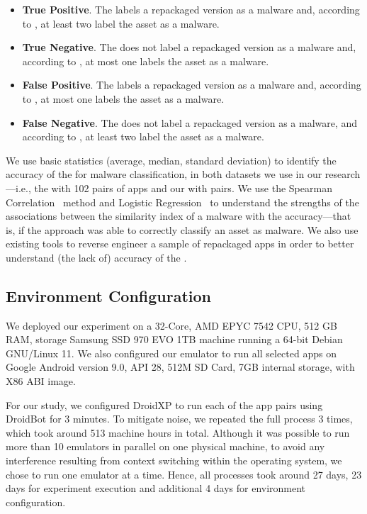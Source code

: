 \begin{itemize}
\item {\bf True Positive}. The \mas labels a repackaged version as a malware and, according to
  \vt, at least two \ses label the asset as a malware.
  
\item {\bf True Negative}. The \mas does not label a repackaged version as a malware and,
  according to \vt, at most one \se labels the asset as a malware. 

\item {\bf False Positive}. The \mas labels a repackaged version as a malware and, according to
  \vt, at most one \se labels the asset as a malware.

\item {\bf False Negative}. The \mas does not label a repackaged version as a malware, and
  according to \vt, at least two \ses label the asset as a malware.
\end{itemize}

We use basic statistics (average, median, standard deviation) to identify the
accuracy of the \mas for malware classification, in both
datasets we use in our research---i.e., the \sds
with 102 pairs of apps and our \cds with
\apps pairs. We use the Spearman Correlation~\cite{spearman-correlation} method and
Logistic Regression~\cite{statistical-learning} to understand the strengths of
the associations between the similarity index of a
malware with the \mas accuracy---that is,
if the approach was able to correctly classify an asset as malware. We also use existing tools to reverse engineer a sample of repackaged
apps in order to better understand (the lack of) accuracy
of the \mas.




\subsection{Environment Configuration}\label{sec:hardware}


We deployed our experiment on a 32-Core, AMD EPYC 7542 CPU, 512 GB RAM, storage Samsung SSD 970 EVO 1TB machine running a 64-bit Debian GNU/Linux 11. We also configured our emulator to run all selected apps on Google Android version 9.0, API 28, 512M SD Card, 7GB internal storage, with X86 ABI image.

For our study, we configured DroidXP to run each of the \apps app pairs using DroidBot for 3 minutes. To mitigate noise, we repeated the full process 3 times,  which took around 513 machine hours in total. Although it was possible to run more than 10 emulators in parallel on one physical machine, to avoid any interference resulting from context switching within the operating system, we chose to run one emulator at a time. Hence, all processes took around 27 days, 23 days for experiment execution and additional 4 days for environment configuration.%

